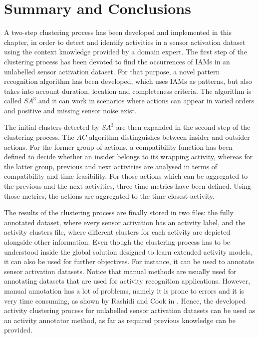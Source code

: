 \section{Summary and Conclusions}
\label{sec:clustering:sum}

A two-step clustering process has been developed and implemented in this chapter, in order to detect and identify activities in a sensor activation dataset using the context knowledge provided by a domain expert. The first step of the clustering process has been devoted to find the occurrences of IAMs in an unlabelled sensor activation dataset. For that purpose, a novel pattern recognition algorithm has been developed, which uses IAMs as patterns, but also takes into account duration, location and completeness criteria. The algorithm is called $SA^3$ and it can work in scenarios where actions can appear in varied orders and positive and missing sensor noise exist.

The initial clusters detected by $SA^3$ are then expanded in the second step of the clustering process. The $AC$ algorithm distinguishes between insider and outsider actions. For the former group of actions, a compatibility function has been defined to decide whether an insider belongs to its wrapping activity, whereas for the latter group, previous and next activities are analysed in terms of compatibility and time feasibility. For those actions which can be aggregated to the previous and the next activities, three time metrics have been defined. Using those metrics, the actions are aggregated to the time closest activity. 

The results of the clustering process are finally stored in two files: the fully annotated dataset, where every sensor activation has an activity label, and the activity clusters file, where different clusters for each activity are depicted alongside other information. Even though the clustering process has to be understood inside the global solution designed to learn extended activity models, it can also be used for further objectives. For instance, it can be used to annotate sensor activation datasets. Notice that manual methods are usually used for annotating datasets that are used for activity recognition applications. However, manual annotation has a lot of problems, namely it is prone to errors and it is very time consuming, as shown by Rashidi and Cook in \cite{Rashidi2011}. Hence, the developed activity clustering process for unlabelled sensor activation datasets can be used as an activity annotator method, as far as required previous knowledge can be provided. 